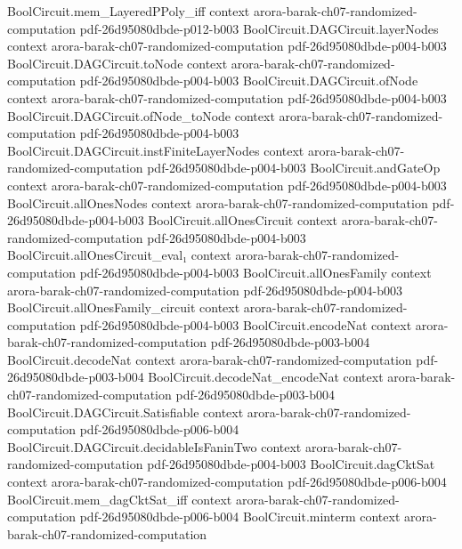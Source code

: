 \begin{theorem}
\proofstep
  {BoolCircuit.mem_LayeredPPoly_iff}
  {context}
  {arora-barak-ch07-randomized-computation}
  {pdf-26d95080dbde-p012-b003}
\proofstep
  {BoolCircuit.DAGCircuit.layerNodes}
  {context}
  {arora-barak-ch07-randomized-computation}
  {pdf-26d95080dbde-p004-b003}
\proofstep
  {BoolCircuit.DAGCircuit.toNode}
  {context}
  {arora-barak-ch07-randomized-computation}
  {pdf-26d95080dbde-p004-b003}
\proofstep
  {BoolCircuit.DAGCircuit.ofNode}
  {context}
  {arora-barak-ch07-randomized-computation}
  {pdf-26d95080dbde-p004-b003}
\proofstep
  {BoolCircuit.DAGCircuit.ofNode_toNode}
  {context}
  {arora-barak-ch07-randomized-computation}
  {pdf-26d95080dbde-p004-b003}
\proofstep
  {BoolCircuit.DAGCircuit.instFiniteLayerNodes}
  {context}
  {arora-barak-ch07-randomized-computation}
  {pdf-26d95080dbde-p004-b003}
\proofstep
  {BoolCircuit.andGateOp}
  {context}
  {arora-barak-ch07-randomized-computation}
  {pdf-26d95080dbde-p004-b003}
\proofstep
  {BoolCircuit.allOnesNodes}
  {context}
  {arora-barak-ch07-randomized-computation}
  {pdf-26d95080dbde-p004-b003}
\proofstep
  {BoolCircuit.allOnesCircuit}
  {context}
  {arora-barak-ch07-randomized-computation}
  {pdf-26d95080dbde-p004-b003}
\proofstep
  {BoolCircuit.allOnesCircuit_eval₁}
  {context}
  {arora-barak-ch07-randomized-computation}
  {pdf-26d95080dbde-p004-b003}
\proofstep
  {BoolCircuit.allOnesFamily}
  {context}
  {arora-barak-ch07-randomized-computation}
  {pdf-26d95080dbde-p004-b003}
\proofstep
  {BoolCircuit.allOnesFamily_circuit}
  {context}
  {arora-barak-ch07-randomized-computation}
  {pdf-26d95080dbde-p004-b003}
\proofstep
  {BoolCircuit.encodeNat}
  {context}
  {arora-barak-ch07-randomized-computation}
  {pdf-26d95080dbde-p003-b004}
\proofstep
  {BoolCircuit.decodeNat}
  {context}
  {arora-barak-ch07-randomized-computation}
  {pdf-26d95080dbde-p003-b004}
\proofstep
  {BoolCircuit.decodeNat_encodeNat}
  {context}
  {arora-barak-ch07-randomized-computation}
  {pdf-26d95080dbde-p003-b004}
\proofstep
  {BoolCircuit.DAGCircuit.Satisfiable}
  {context}
  {arora-barak-ch07-randomized-computation}
  {pdf-26d95080dbde-p006-b004}
\proofstep
  {BoolCircuit.DAGCircuit.decidableIsFaninTwo}
  {context}
  {arora-barak-ch07-randomized-computation}
  {pdf-26d95080dbde-p004-b003}
\proofstep
  {BoolCircuit.dagCktSat}
  {context}
  {arora-barak-ch07-randomized-computation}
  {pdf-26d95080dbde-p006-b004}
\proofstep
  {BoolCircuit.mem_dagCktSat_iff}
  {context}
  {arora-barak-ch07-randomized-computation}
  {pdf-26d95080dbde-p006-b004}
\proofstep
  {BoolCircuit.minterm}
  {context}
  {arora-barak-ch07-randomized-computation}

\end{theorem}
